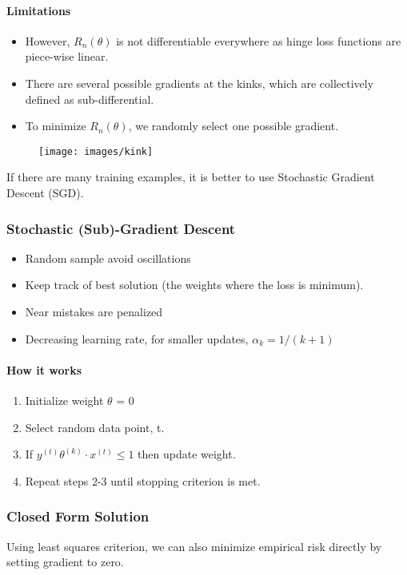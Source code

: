 \documentclass[a4paper]{article}
\begin{document}
\paragraph{Limitations}
\begin{itemize}
	\item However, $R_n(\theta)$ is not differentiable everywhere as hinge loss functions are piece-wise linear.
	\item There are several possible gradients at the kinks, which are collectively defined as sub-differential.
	\item To minimize $R_n(\theta)$, we randomly select one possible gradient.
\end{itemize}
\begin{figure}[H]
	\centering
	\texttt{[image: images/kink]}
	\label{fig:kink}
\end{figure}
If there are many training examples, it is better to use Stochastic Gradient Descent (SGD).
\subsubsection{Stochastic (Sub)-Gradient Descent}
\begin{itemize}
	\item Random sample avoid oscillations
	\item Keep track of best solution (the weights where the loss is minimum).
	\item Near mistakes are penalized
	\item Decreasing learning rate, for smaller updates, $\alpha_k = 1/(k+1)$
\end{itemize}
\paragraph{How it works}
\begin{enumerate}
	\item Initialize weight $\theta$ = 0
	\item Select random data point, t.
	\item If $y^{(t)}\theta^{(k)} \cdot x^{(t)} \leq 1$ then update weight.
	\item Repeat steps 2-3 until stopping criterion is met.
\end{enumerate}
\subsubsection{Closed Form Solution}
Using least squares criterion, we can also minimize empirical risk directly by setting gradient to zero.
\end{document}
